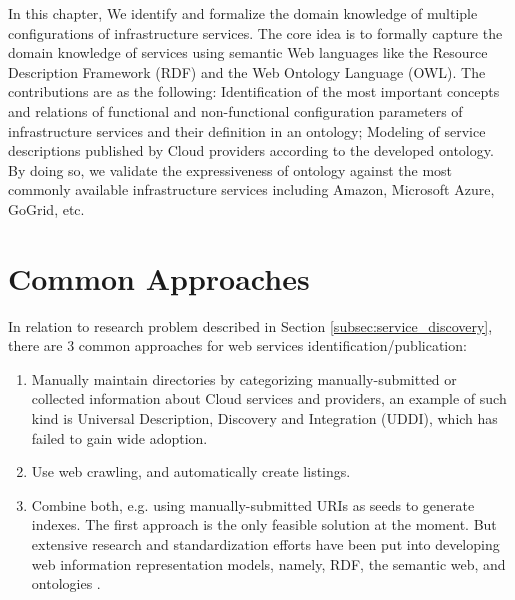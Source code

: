 In this chapter, We identify and formalize the domain knowledge of multiple
configurations of infrastructure services. The core idea is to
formally capture the domain knowledge of services using
semantic Web languages like the Resource Description
Framework (RDF) and the Web Ontology Language (OWL).
The contributions are as the following:
Identification of the most important concepts and
relations of functional and non-functional
configuration parameters of infrastructure services
and their definition in an ontology;
Modeling of service descriptions published by
Cloud providers according to the developed
ontology. By doing so, we validate the
expressiveness of ontology against the most
commonly available infrastructure services
including Amazon, Microsoft Azure, GoGrid, etc.


\section{Common Approaches}
In relation to research problem described in Section \ref{subsec:service_discovery}, there are 3 common approaches for web services identification/publication: 
\begin{enumerate}
    \item Manually maintain directories by categorizing manually-submitted or collected information about Cloud services and providers, an example of such kind is Universal Description, Discovery and Integration (UDDI), which has failed to gain wide adoption.
    \item Use web crawling, and automatically create listings.
    \item Combine both, e.g. using manually-submitted URIs as seeds to generate indexes. The first approach is the only feasible solution at the moment. But extensive research and standardization efforts have been put into developing web information representation models, namely, RDF, the semantic web, and ontologies \cite{Al-Hamdani2003}.
\end{enumerate}

